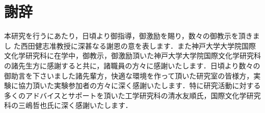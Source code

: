 \section*{謝辞}

本研究を行うにあたり，日頃より御指導，御激励を賜り，数々の御教示を頂きまし
た西田健志准教授に深甚なる謝恩の意を表します．また神戸大学大学院国際文化学研究科に在学中，御教示，御激励頂いた神戸大学大学院国際文化学研究科の諸先生方に感謝すると共に，諸職員の方々に感謝いたします．日頃より数々の御助言を下さいました諸先輩方，快適な環境を作って頂いた研究室の皆様方，実験に協力頂いた実験参加者の方々に深く感謝いたします．特に研究活動に対する多くのアドバイスとサポートを頂いた工学研究科の清水友順氏，国際文化学研究科の三嶋哲也氏に深く感謝いたします．